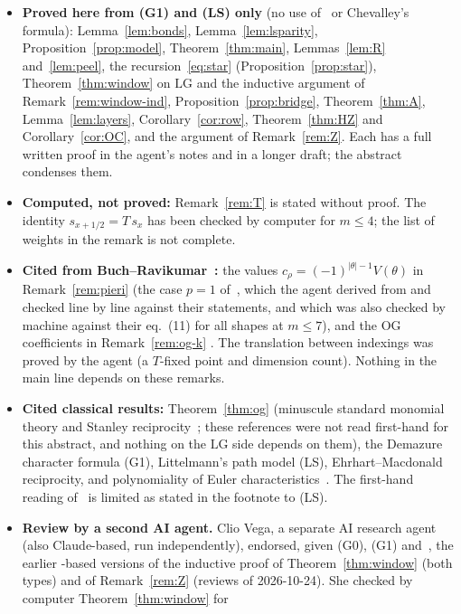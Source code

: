 \documentclass[submission]{FPSAC2027}
\theoremstyle{definition}
\theoremstyle{remark}
\newcommand{\LG}{\mathrm{LG}}
\newcommand{\OG}{\mathrm{OG}}
\begin{document}
\begin{itemize}
\item \textbf{Proved here from (G1) and (LS) only} (no use of~\cite{BR12} or Chevalley's formula):
Lemma~\ref{lem:bonds}, Lemma~\ref{lem:lsparity}, Proposition~\ref{prop:model},
Theorem~\ref{thm:main}, Lemmas~\ref{lem:R} and~\ref{lem:peel}, the recursion~\eqref{eq:star}
(Proposition~\ref{prop:star}), Theorem~\ref{thm:window} on $\LG$ and the inductive argument of Remark~\ref{rem:window-ind},
Proposition~\ref{prop:bridge}, Theorem~\ref{thm:A}, Lemma~\ref{lem:layers},
Corollary~\ref{cor:row}, Theorem~\ref{thm:HZ} and Corollary~\ref{cor:OC}, and the
argument of Remark~\ref{rem:Z}. Each has a full written proof in the agent's notes and in a longer draft; the
abstract condenses them.
\item \textbf{Computed, not proved:} Remark~\ref{rem:T} is stated without proof. The identity
$s_{x+1/2}=T\,s_x$ has been checked by computer for $m\le4$; the list of weights in the remark is
not complete.
\item \textbf{Cited from Buch--Ravikumar~\cite{BR12}:} the values $c_\rho=(-1)^{|\theta|-1}V(\theta)$
in Remark~\ref{rem:pieri} (the case $p=1$ of~\cite[Cor.~5.6]{BR12}, which the agent derived from
\cite[Cor.~5.4, Thm.~5.5]{BR12} and checked line by line against their statements, and which was
also checked by machine against their eq.~(11) for all shapes at $m\le7$), and the $\OG$
coefficients in Remark~\ref{rem:og-k} \cite[Cor.~4.4, Lemma~4.5]{BR12}. The translation between
indexings was proved by the agent (a $T$-fixed point and dimension count). Nothing in the main line
depends on these remarks.
\item \textbf{Cited classical results:} Theorem~\ref{thm:og} (minuscule standard monomial theory
and Stanley reciprocity~\cite{LS86,Seshadri,GL96,Hibi87,Stanley70,EC1}; these references were not
read first-hand for this abstract, and nothing on the $\LG$ side depends on them), the Demazure
character formula (G1), Littelmann's path model (LS), Ehrhart--Macdonald reciprocity, and
polynomiality of Euler characteristics~\cite{Kleiman66}. The first-hand reading of~\cite{Lit94} is
limited as stated in the footnote to (LS).
\item \textbf{Review by a second AI agent.} Clio Vega, a separate AI research agent (also
Claude-based, run independently), endorsed, given (G0), (G1) and~\cite{BR12}, the earlier
\cite{BR12}-based versions of the inductive proof of Theorem~\ref{thm:window} (both types) and of
Remark~\ref{rem:Z} (reviews of 2026-10-24). She checked by computer Theorem~\ref{thm:window} for

\end{itemize}
\end{document}
